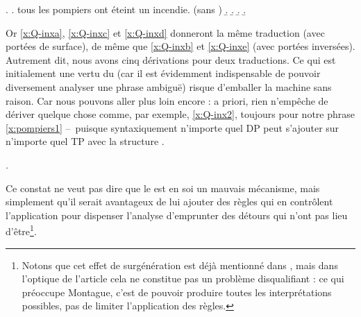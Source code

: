 \ex. \label{x:Q-inx}
\a. tous les pompiers ont éteint un incendie. \hfill{\small(sans )}\label{x:Q-inxa}
\b. \label{x:Q-inxb}
\b. \label{x:Q-inxc}
\b. \label{x:Q-inxd}
\b. \label{x:Q-inxe}

Or \ref{x:Q-inxa}, \ref{x:Q-inxc} et \ref{x:Q-inxd} donneront la même traduction (avec portées de surface), de même que \ref{x:Q-inxb} et \ref{x:Q-inxe} (avec portées inversées).  Autrement dit, nous avons cinq dérivations pour deux traductions.  Ce qui est initialement une vertu du  (car il est évidemment indispensable de pouvoir diversement analyser une phrase ambiguë) risque d'emballer la machine sans raison.  Car nous pouvons aller plus loin encore : a priori, rien n'empêche de dériver quelque chose comme, par exemple, \ref{x:Q-inx2}, toujours pour notre phrase \ref{x:pompiers1} --~puisque syntaxiquement n'importe quel DP peut s'ajouter sur n'importe quel TP avec la structure .

\ex. \label{x:Q-inx2}


Ce constat ne veut pas dire que le  est en soi un mauvais mécanisme, mais simplement qu'il serait avantageux de lui ajouter des règles qui en contrôlent l'application pour dispenser l'analyse d'emprunter des détours qui n'ont pas lieu d'être\footnote{Notons que cet effet de surgénération est déjà mentionné dans \citet{PTQ}, mais dans l'optique de l'article cela ne constitue pas un problème disqualifiant : ce qui préoccupe Montague, c'est de pouvoir produire toutes les interprétations possibles, pas de limiter l'application des règles.}.

